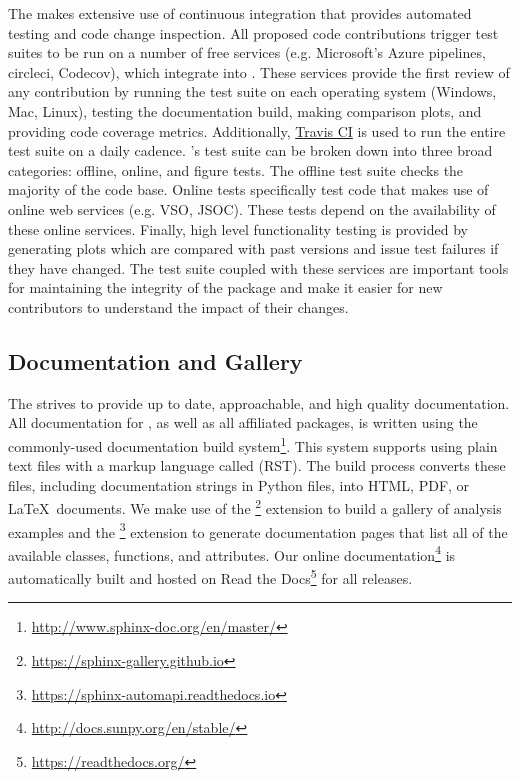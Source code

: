 The \sunpyproj makes extensive use of continuous integration that provides automated testing and code change inspection.
All proposed code contributions trigger test suites to be run on a number of free services (e.g.
Microsoft's Azure pipelines, circleci, Codecov), which integrate into \github.
These services provide the first review of any contribution by running the test suite on each operating system (Windows, Mac, Linux), testing the documentation build, making comparison plots, and providing code coverage metrics.
Additionally, \href{https://travis-ci.org}{Travis CI} is used to run the entire test suite on a daily cadence.
\sunpypkg's test suite can be broken down into three broad categories: offline, online, and figure tests.
The offline test suite checks the majority of the code base.
Online tests specifically test code that makes use of online web services (e.g. VSO, JSOC).
These tests depend on the availability of these online services.
Finally, high level functionality testing is provided by generating plots which are compared with past versions and issue test failures if they have changed.
The \sunpypkg test suite coupled with these services are important tools for maintaining the integrity of the package and make it easier for new contributors to understand the impact of their changes.

\subsection{Documentation and Gallery}
\label{sec:docs}

The \sunpyproj strives to provide up to date, approachable, and high quality documentation.
All documentation for \sunpypkg, as well as all affiliated packages, is written using the commonly-used  documentation build system\footnote{\url{http://www.sphinx-doc.org/en/master/}}.
This system supports using plain text files with a markup language called  (RST).
The build process converts these files, including documentation strings in Python files, into HTML, PDF, or \LaTeX\ documents.
We make use of the \footnote{\url{https://sphinx-gallery.github.io}} extension to build a gallery of analysis examples and the \footnote{\url{https://sphinx-automapi.readthedocs.io}} extension to generate documentation pages that list all of the available classes, functions, and attributes.
Our online documentation\footnote{\url{http://docs.sunpy.org/en/stable/}} is automatically built and hosted on Read the Docs\footnote{\url{https://readthedocs.org/}} for all releases.
